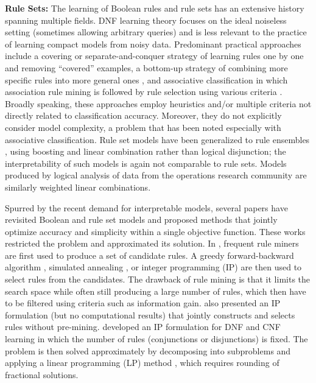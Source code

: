 \documentclass[twoside,11pt]{article}
\begin{document}
\textbf{Rule Sets: } The learning of Boolean rules and rule sets has an extensive history spanning multiple fields.  DNF learning theory \citep[e.g.][]{valiant1984,klivans2004,feldman2012} focuses on the ideal noiseless setting (sometimes allowing arbitrary queries) and is less relevant to the practice of learning compact models from noisy data.  Predominant practical approaches include a covering or separate-and-conquer strategy \citep{clark1989,clark1991,cohen1995,frank1998,friedman1999,marchand2003,fuernkranz2012} of learning rules one by one and removing ``covered'' examples, a bottom-up strategy of combining more specific rules into more general ones \citep{salzberg1991,domingos1996,muselli2002}, and associative classification in which association rule mining is followed by rule selection using various criteria \citep{liu1998,li2001,yin2003,wang2005,chen2006,cheng2007}.  Broadly speaking, these approaches employ heuristics and/or multiple criteria not directly related to classification accuracy.  Moreover, they do not explicitly consider model complexity, a problem that has been noted especially with associative classification.  Rule set models have been generalized to rule ensembles \citep{cohen1999,friedman2008,dembczynski2010,wei2019generalized}, using boosting and linear combination rather than logical disjunction; the interpretability of such models is again not comparable to rule sets.  Models produced by logical analysis of data \citep{boros2000,hammer2006} from the operations research community are similarly weighted linear combinations.

Spurred by the recent demand for interpretable models, several papers have revisited Boolean and rule set models and proposed methods that jointly optimize accuracy and simplicity within a single objective function.  These works restricted the problem and approximated its solution.  In \cite{lakkaraju2016,wang2017,wang2015}, frequent rule miners are first used to produce a set of candidate rules.  A greedy forward-backward algorithm \citep{lakkaraju2016}, simulated annealing \citep{wang2017}, or integer programming (IP) \citep[in an unpublished manuscript][]{wang2015} are then used to select rules from the candidates.  The drawback of rule mining is that it limits the search space while often still producing a large number of rules, which then have to be filtered using criteria such as information gain.  \cite{wang2015} also presented an IP formulation (but no computational results) that jointly constructs and selects rules without pre-mining.  \cite{su2016} developed an IP formulation for DNF and CNF learning in which the number of rules (conjunctions or disjunctions) is fixed.  The problem is then solved approximately by decomposing into subproblems and applying a linear programming (LP) method \citep{malioutov2013}, which requires rounding of fractional solutions. 
\end{document}
